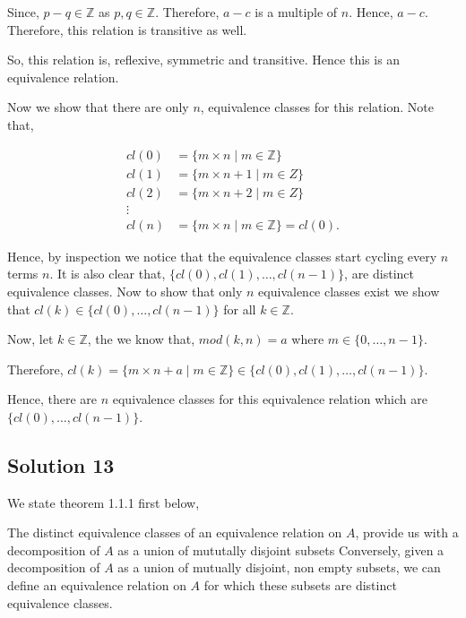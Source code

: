  Since, \( p - q \in \mathbb{Z} \) as \( p,q \in \mathbb{Z}  \). Therefore,
 \( a - c \) is a multiple of \( n \). Hence, \( a - c \).
 Therefore, this relation is transitive as well.

 So, this relation is, reflexive, symmetric and transitive. Hence this 
 is an equivalence relation.

 Now we show that there are only \( n \), equivalence classes for this relation. Note that,

 \begin{align*}
   cl(0) &= \{ m \times n \mid m \in \mathbb{Z}\}   \\
   cl(1) &= \{ m \times  n + 1 \mid m \in Z\}  \\
   cl(2) &= \{ m \times  n + 2 \mid m \in Z\}  \\
   \vdots \\
   cl(n) &= \{ m \times n \mid m \in \mathbb{Z}\} = cl(0)
 .\end{align*}

 Hence, by inspection we notice that the equivalence classes 
 start cycling every \( n \) terms \( n \). It is also clear that, \( \{cl(0), cl(1), \ldots, cl(n-1)\}\), are distinct equivalence classes. 
 Now to show that only \( n \) equivalence classes exist we show that \( cl(k)  \in  \{cl(0), \ldots, cl(n-1)\}\) for
 all \( k \in \mathbb{Z} \).

 Now, let \( k \in \mathbb{Z} \), the we know that, \(  mod(k,n)  = a\) where \( m \in \{0, \ldots, n-1\}   \).

 Therefore, \( cl(k) = \{ m \times n + a \mid m \in \mathbb{Z}\}  \in \{cl(0), cl(1), \ldots, cl(n-1)\} \).

 Hence, there are \(n  \) equivalence classes for this equivalence relation which are \( \{cl(0), \ldots, cl(n-1)\}   \).

 \subsection{Solution 13}

 We state theorem 1.1.1 first below, 

 \begin{theorem}
 The distinct equivalence classes of an equivalence relation on \( A \), provide us with a decomposition of \( A \) as a union of mututally disjoint subsets
 Conversely, given a decomposition of \( A \) as a union of mutually disjoint, non empty subsets, we can define an equivalence relation on \( A \) for which
 these subsets are distinct equivalence classes.
 \end{theorem}

